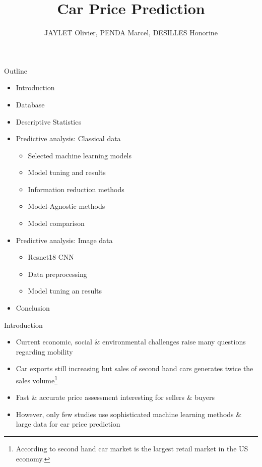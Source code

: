 \documentclass{beamer}
\title{Car Price Prediction}
\author{JAYLET Olivier, PENDA Marcel, DESILLES Honorine}
\begin{document}
\begin{frame}
  \titlepage
\end{frame}

    \begin{frame}{Outline}
    \begin{itemize}
        \item Introduction
        \item Database
        \item Descriptive Statistics
        \item Predictive analysis: Classical data
            \begin{itemize}
                \item Selected machine learning models
                \item Model tuning and results
                \item Information reduction methods
                \item Model-Agnostic methods
                \item Model comparison
            \end{itemize}
        \item Predictive analysis: Image data
            \begin{itemize}
                \item Resnet18 CNN
                \item Data preprocessing
                \item Model tuning an results
            \end{itemize}
        \item Conclusion        
            
    \end{itemize}
        
    \end{frame}

\begin{frame}{Introduction} 
    
    \begin{itemize}
        \item Current economic, social \& environmental challenges raise many questions regarding mobility

        \item Car exports still increasing but sales of second hand cars generates twice the sales volume\footnote{According to \cite{Celik2019} second hand car market is the largest retail market in the US economy.}

        \item Fast \& accurate price assessment interesting for sellers \& buyers

        \item However, only few studies use sophisticated machine learning methods \& large data for car price prediction
    \end{itemize}
    
\end{frame}
\end{document}
